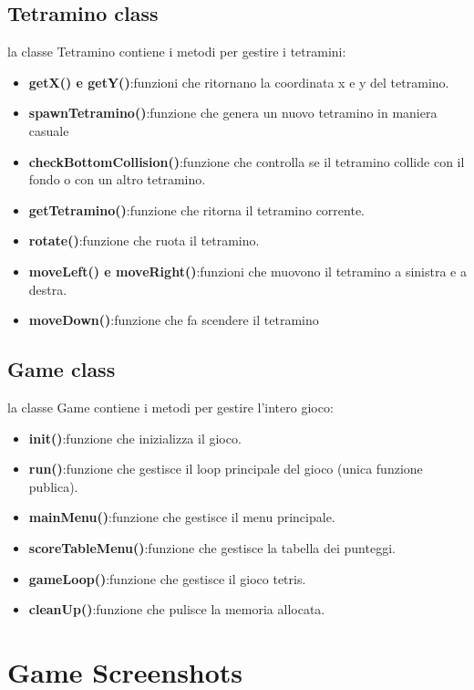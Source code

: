 \documentclass{article}
\begin{document}
\subsection{Tetramino class}

la classe Tetramino contiene i metodi per gestire i tetramini:
\begin{itemize}
    \item \textbf{getX() e getY()}:funzioni che ritornano la coordinata x e y del tetramino.
    \item \textbf{spawnTetramino()}:funzione che genera un nuovo tetramino in maniera casuale
    \item \textbf{checkBottomCollision()}:funzione che controlla se il tetramino collide con il fondo o con un altro tetramino.
    \item \textbf{getTetramino()}:funzione che ritorna il tetramino corrente.
    \item \textbf{rotate()}:funzione che ruota il tetramino.
    \item \textbf{moveLeft() e moveRight()}:funzioni che muovono il tetramino a sinistra e a destra.
    \item \textbf{moveDown()}:funzione che fa scendere il tetramino
\end{itemize}

\subsection{Game class}
la classe Game contiene i metodi per gestire l'intero gioco:
\begin{itemize}
    \item \textbf{init()}:funzione che inizializza il gioco.
    \item \textbf{run()}:funzione che gestisce il loop principale del gioco (unica funzione publica).
    \item \textbf{mainMenu()}:funzione che gestisce il menu principale.
    \item \textbf{scoreTableMenu()}:funzione che gestisce la tabella dei punteggi.
    \item \textbf{gameLoop()}:funzione che gestisce il gioco tetris.
    \item \textbf{cleanUp()}:funzione che pulisce la memoria allocata.
\end{itemize}


\section{Game Screenshots}
\end{document}
